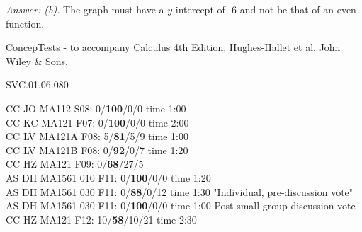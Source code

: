 {\it Answer: (b).} The graph must have a $y$-intercept of -6 and not be that of an even function.


\medskip
ConcepTests - to accompany Calculus 4th Edition, Hughes-Hallet et al. John Wiley \& Sons.

SVC.01.06.080


CC JO MA112 S08: 0/{\bf 100}/0/0 time 1:00 \\ 
CC KC MA121 F07: 0/{\bf 100}/0/0 time 2:00 \\
CC LV MA121A F08: 5/{\bf81}/5/9 time 1:00\\
CC LV MA121B F08: 0/{\bf92}/0/7 time 1:20\\
CC HZ MA121 F09: 0/{\bf68}/27/5  \\
AS DH MA1561 010 F11: 0/{\bf100}/0/0 time 1:20  \\
AS DH MA1561 030 F11: 0/{\bf88}/0/12 time 1:30 "Individual, pre-discussion vote" \\
AS DH MA1561 030 F11: 0/{\bf100}/0/0 time 1:00 Post small-group discussion vote \\
CC HZ MA121 F12: 10/{\bf58}/10/21 time 2:30  \\
